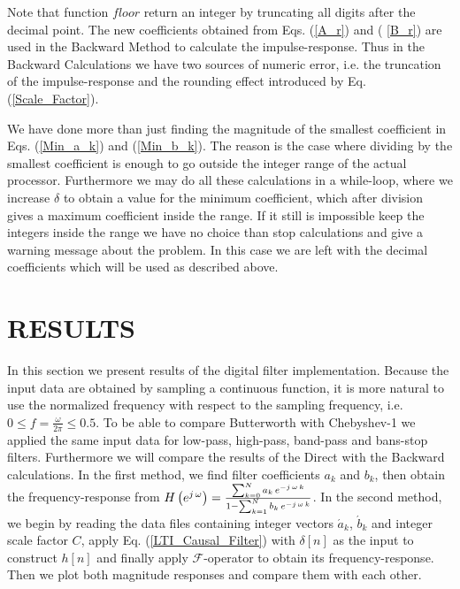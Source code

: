 \documentclass{sebase}
\begin{document}
\begin{remark}
Note that function $floor$ return an integer by truncating all digits after
the decimal point. The new coefficients obtained from Eqs. (\ref{A_r}) and (%
\ref{B_r}) are used in the Backward Method to calculate the
impulse-response. Thus in the Backward Calculations we have two sources of
numeric error, i.e. the truncation of the impulse-response and the rounding
effect introduced by Eq. (\ref{Scale_Factor}).
\end{remark}

\begin{remark}
We have done more than just finding the magnitude of the smallest
coefficient in Eqs. (\ref{Min_a_k}) and (\ref{Min_b_k}). The reason is the
case where dividing by the smallest coefficient is enough to go outside the
integer range of the actual processor. Furthermore we may do all these
calculations in a while-loop, where we increase $\delta $ to obtain a value
for the minimum coefficient, which after division gives a maximum
coefficient inside the range. If it still is impossible keep the integers
inside the range we have no choice than stop calculations and give a warning
message about the problem. In this case we are left with the decimal
coefficients which will be used as described above.
\end{remark}

\section{RESULTS}

In this section we present results of the digital filter implementation.
Because the input data are obtained by sampling a continuous function, it is
more natural to use the normalized frequency with respect to the sampling
frequency, i.e. $0\leq f=\frac{\omega }{2\pi }\leq 0.5.$ To be able to
compare Butterworth with Chebyshev-1 we applied the same input data for
low-pass, high-pass, band-pass and bans-stop filters. Furthermore we will
compare the results of the Direct with the Backward calculations. In the
first method, we find filter coefficients $a_{k}$ and $b_{k}$, then obtain
the frequency-response from $H\left( e^{j\,\omega }\right) =\frac{%
\sum_{k=0}^{N}a_{k}\,e^{-j\,\omega \,k}}{1-\sum_{k=1}^{N}b_{k}\,e^{-j\,%
\omega \,k}}$. In the second method, we begin by reading the data files
containing integer vectors $\acute{a}_{k}$, $\acute{b}_{k}$ and integer
scale factor $C$, apply Eq. (\ref{LTI_Causal_Filter}) with $\delta \left[ n%
\right] $ as the input to construct $h\left[ n\right] $ and finally apply $%
\mathcal{F}$-operator to obtain its frequency-response. Then we plot both
magnitude responses and compare them with each other.
\end{document}
